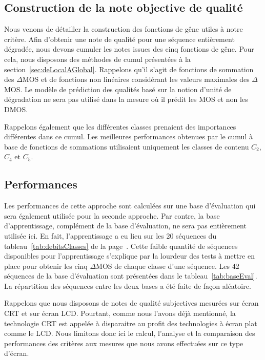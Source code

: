 \subsection{Construction de la note objective de qualité}
Nous venons de détailler la construction des fonctions de gêne utiles à notre critère. Afin d'obtenir une note de qualité pour une séquence entièrement dégradée, nous devons cumuler les notes issues des cinq fonctions de gêne. Pour cela, nous disposons des méthodes de cumul présentées à la section~\ref{sec:deLocalAGlobal}. Rappelons qu'il s'agit de fonctions de sommation des $\Delta$MOS et de fonctions non linéaires considérant les valeurs maximales des $\Delta$MOS. Le modèle de prédiction des qualités basé sur la notion d'unité de dégradation ne sera pas utilisé dans la mesure où il prédit les MOS et non les DMOS.

Rappelons également que les différentes classes prenaient des importances différentes dans ce cumul. Les meilleures performances obtenues par le cumul à base de fonctions de sommations utilisaient uniquement les classes de contenu $C_2$, $C_4$ et $C_5$.


\subsection{Performances}
Les performances de cette approche sont calculées sur une base d'évaluation qui sera également utilisée pour la seconde approche. Par contre, la base d'apprentissage, complément de la base d'évaluation, ne sera pas entièrement utilisée ici. En fait, l'apprentissage a eu lieu sur les 20 séquences du tableau~\ref{tab:debitsClasses} de la page~\pageref{tab:debitsClasses}. Cette faible quantité de séquences disponibles pour l'apprentissage s'explique par la lourdeur des tests à mettre en place pour obtenir les cinq $\Delta$MOS de chaque classe d'une séquence. Les 42 séquences de la base d'évaluation sont présentées dans le tableau~\ref{tab:baseEval}. La répartition des séquences entre les deux bases a été faite de façon aléatoire.

Rappelons que nous disposons de notes de qualité subjectives mesurées sur écran CRT et sur écran LCD. Pourtant, comme nous l'avons déjà mentionné, la technologie CRT est appelée à disparaitre au profit des technologies à écran plat comme le LCD. Nous limitons donc ici le calcul, l'analyse et la comparaison des performances des critères aux mesures que nous avons effectuées sur ce type d'écran.


